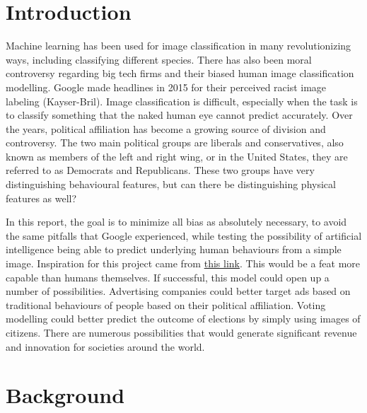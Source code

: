 \documentclass[manuscript,screen,review]{acmart}
\begin{document}

\maketitle

\section{Introduction}

Machine learning has been used for image classification in many revolutionizing ways, including classifying different species. There has also been moral controversy regarding big tech firms and their biased human image classification modelling. Google made headlines in 2015 for their perceived racist image labeling (Kayser-Bril). Image classification is difficult, especially when the task is to classify something that the naked human eye cannot predict accurately. Over the years, political affiliation has become a growing source of division and controversy. The two main political groups are liberals and conservatives, also known as members of the left and right wing, or in the United States, they are referred to as Democrats and Republicans. These two groups have very distinguishing behavioural features, but can there be distinguishing physical features as well?

In this report, the goal is to minimize all bias as absolutely necessary, to avoid the same pitfalls that Google experienced, while testing the possibility of artificial intelligence being able to predict underlying human behaviours from a simple image. Inspiration for this project came from \href{ttps://www.nature.com/articles/s41598-020-79310-1 }{this link}. This would be a feat more capable than humans themselves. If successful, this model could open up a number of possibilities. Advertising companies could better target ads based on traditional behaviours of people based on their political affiliation. Voting modelling could better predict the outcome of elections by simply using images of citizens. There are numerous possibilities that would generate significant revenue and innovation for societies around the world.

\section{Background}
\end{document}
